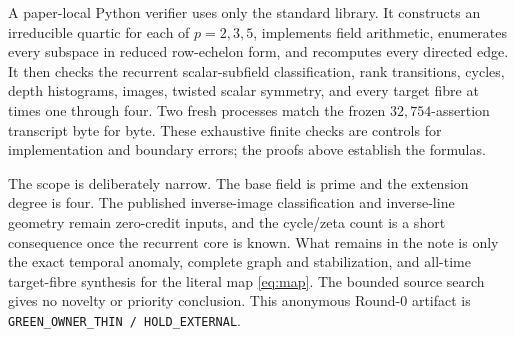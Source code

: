 \documentclass[a4paper,10pt]{amsart}
\theoremstyle{remark}
\begin{document}
A paper-local Python verifier uses only the standard library.  It constructs
an irreducible quartic for each of $p=2,3,5$, implements field arithmetic,
enumerates every subspace in reduced row-echelon form, and recomputes every
directed edge.  It then checks the recurrent scalar-subfield classification,
rank transitions, cycles, depth histograms, images, twisted scalar symmetry,
and every target fibre at times one through four.  Two fresh processes match
the frozen $32{,}754$-assertion transcript byte for byte.  These exhaustive
finite checks are controls for implementation and boundary errors; the proofs
above establish the formulas.

The scope is deliberately narrow.  The base field is prime and the extension
degree is four.  The published inverse-image classification and inverse-line
geometry remain zero-credit inputs, and the cycle/zeta count is a short
consequence once the recurrent core is known.  What remains in the note is
only the exact temporal anomaly, complete graph and stabilization, and
all-time target-fibre synthesis for the literal map \eqref{eq:map}.  The
bounded source search gives no novelty or priority conclusion.  This anonymous
Round-0 artifact is \texttt{GREEN\_OWNER\_THIN / HOLD\_EXTERNAL}.



\end{document}
